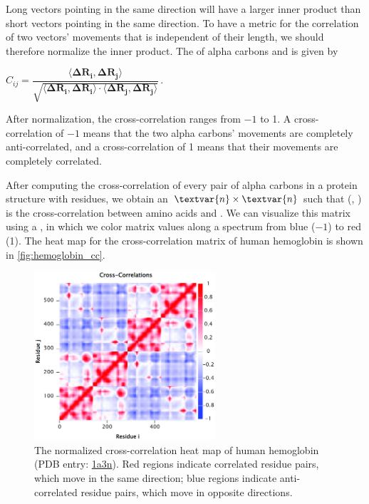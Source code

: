 Long vectors pointing in the same direction will have a larger inner product than short vectors pointing in the same direction. To have a metric for the correlation of two vectors' movements that is independent of their length, we should therefore normalize the inner product. The  of alpha carbons  and  is given by

\begin{center}
$ C_{ij} = \dfrac{\langle \mathbf{\Delta R_i}, \mathbf{\Delta R_j} \rangle}{\sqrt{\langle \mathbf{\Delta R_i}, \mathbf{\Delta R_i} \rangle \cdot \langle \mathbf{\Delta R_j}, \mathbf{\Delta R_j} \rangle}}$\,.
\end{center}

\noindent After normalization, the cross-correlation ranges from $-1$ to 1. A cross-correlation of $-1$ means that the two alpha carbons' movements are completely anti-correlated, and a cross-correlation of 1 means that their movements are completely correlated.

After computing the cross-correlation of every pair of alpha carbons in a protein structure with  residues, we obtain an $\textvar{n} \times \textvar{n}$   such that (, ) is the cross-correlation between amino acids  and . We can visualize this matrix using a , in which we color matrix values along a spectrum from blue ($-1$) to red (1). The heat map for the cross-correlation matrix of human hemoglobin is shown in \autoref{fig:hemoglobin_cc}.

\begin{figure}[h]
	\centering
	\mySfFamily
	\includegraphics[width = 0.6\textwidth]{../images_CMYK/hemoglobin_cc}
	\caption{The normalized cross-correlation heat map of human hemoglobin (PDB entry: \href{https://www.rcsb.org/structure/1a3n}{1a3n}). Red regions indicate correlated residue pairs, which move in the same direction; blue regions indicate anti-correlated residue pairs, which move in opposite directions.}
	\label{fig:hemoglobin_cc}
\end{figure}

